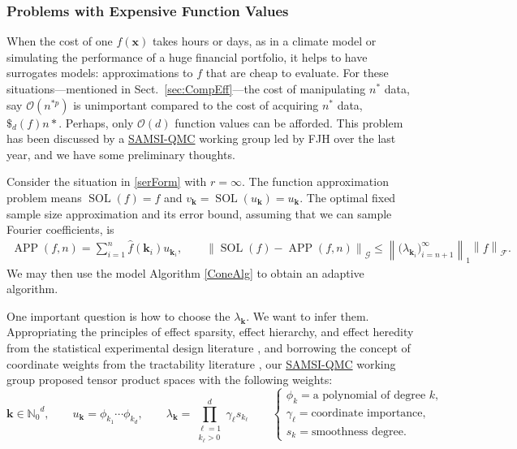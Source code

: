 \documentclass[11pt]{NSFamsart}
\newcommand{\SAMSIQMC}{\hyperlink{SAMSIlink}{SAMSI-QMC}\xspace}
\newcommand{\hf}{\widehat{f}}
\newcommand{\natzero}{{\mathbb{N}_0}}
\DeclareMathOperator{\SOL}{SOL}
\DeclareMathOperator{\APP}{APP}
\newcommand{\bx}{{\boldsymbol{x}}}
\newcommand{\bk}{{\boldsymbol{k}}}
\newcommand{\calf}{{\mathcal{F}}}
\newcommand{\calg}{{\mathcal{G}}}
\newcommand{\norm}[2][{}]{\ensuremath{\left \lVert #2 \right \rVert}_{#1}}
\newcommand{\bignorm}[2][{}]{\ensuremath{\bigl \lVert #2 \bigr \rVert}_{#1}}
\newcommand{\Order}{\mathcal{O}}
\begin{document}
\subsubsection{Problems with Expensive Function Values} 
\label{sec:Expensive}

When the cost of one $f(\bx)$ takes hours or days, as in a climate model or simulating the performance of a huge financial portfolio, it helps to have surrogates models: approximations to $f$ that are cheap to evaluate.  For these situations---mentioned in Sect.\ \ref{sec:CompEff}---the cost of manipulating $n^*$ data, say $\Order(n^{*p})$ is unimportant compared to the cost of acquiring $n^*$ data, $\$_d(f)n*$.  Perhaps, only $\Order(d)$ function values can be afforded.  This problem has been discussed by a \SAMSIQMC working group led by FJH over the last year, and we have some preliminary thoughts.  

Consider the situation in \eqref{serForm} with $r = \infty$.  The function approximation problem means $\SOL(f) = f$ and $v_{\bk} = \SOL(u_{\bk}) = u_{\bk}$.  The optimal fixed sample size approximation and its error bound, assuming that we can sample Fourier coefficients, is 
\begin{gather*}
    \APP(f,n) = \sum_{i=1}^n \hf(\bk_i) u_{\bk_i}, \qquad
    \norm[\calg]{\SOL(f) - \APP(f,n)} %
    \le \norm[1] {\bigl(\lambda_{\bk_i}\bigr)_{i=n+1}^\infty } \norm[\calf]{f}.
\end{gather*}
We may then use the model Algorithm \ref{ConeAlg} to obtain an adaptive algorithm.  

One important question is how to choose the $\lambda_{\bk}$.  We want to infer them.  Appropriating the principles of effect sparsity, effect hierarchy, and effect heredity from the statistical experimental design literature \cite{WuHam00}, and borrowing the concept of coordinate weights from the tractability literature \cite{DicEtal14a}, our \SAMSIQMC working group proposed tensor product spaces with the following weights:
\[
\bk \in \natzero^d, \qquad u_{\bk} = \phi_{k_1} \cdots \phi_{k_d}, \qquad \lambda_{\bk} = \prod_{\substack{\ell = 1 \\ k_{\ell} > 0 }}^d \gamma_{\ell}s_{k_\ell} 
\qquad \begin{cases} \phi_k = \text{a polynomial of degree }k, \\
\gamma_{\ell} = \text{coordinate importance}, \\
s_{k} = \text{smoothness degree}.
\end{cases}
\]
\end{document}
